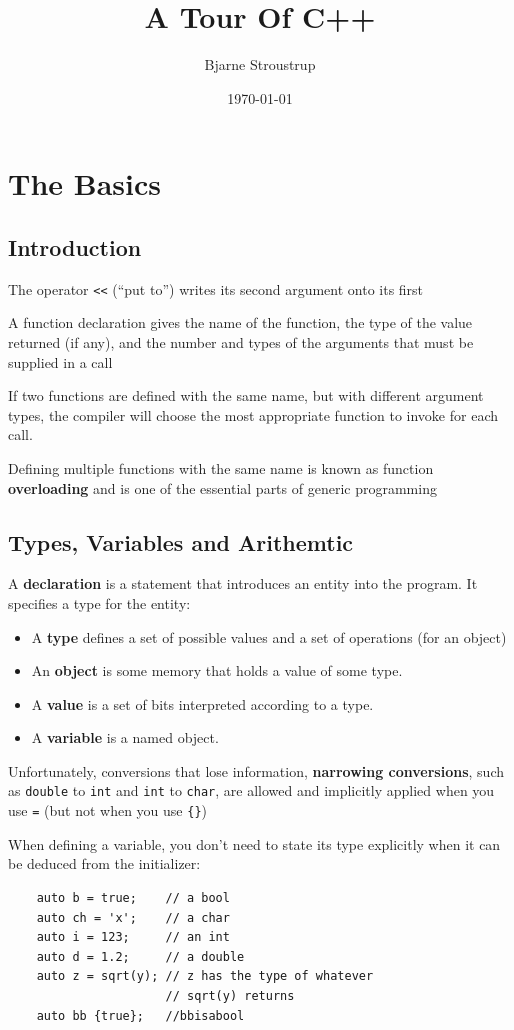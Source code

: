 \documentclass[11pt]{article}
\author{Bjarne Stroustrup}
\date{\today}
\title{A Tour Of C++}
\begin{document}
\maketitle
\tableofcontents

\section{The Basics}
\label{sec:org4c8b103}
\subsection{Introduction}
\label{sec:orgff95d27}
The operator \texttt{<<} (``put to'') writes its second argument onto its first

A function declaration gives the name of the function, the type of the value returned (if any),
and the number and types of the arguments that must be supplied in a call

If two functions are defined with the same name, but with different argument types, the compiler
will choose the most appropriate function to invoke for each call.

Defining multiple functions with the same name is known as function \textbf{overloading} and is one of the
essential parts of generic programming
\subsection{Types, Variables and Arithemtic}
\label{sec:orga438208}
A \textbf{declaration} is a statement that introduces an entity into the program. It specifies a type for
the entity:
\begin{itemize}
\item A \textbf{type} defines a set of possible values and a set of operations (for an object)
\item An \textbf{object} is some memory that holds a value of some type.
\item A \textbf{value} is a set of bits interpreted according to a type.
\item A \textbf{variable} is a named object.
\end{itemize}


Unfortunately, conversions that lose information, \textbf{narrowing conversions}, such as \texttt{double} to \texttt{int}
and \texttt{int} to \texttt{char}, are allowed and implicitly applied when you use \texttt{=} (but not when you use \texttt{\{\}})

When defining a variable, you don’t need to state its type explicitly when it can be deduced
from the initializer:
\begin{verbatim}
    auto b = true;    // a bool
    auto ch = 'x';    // a char
    auto i = 123;     // an int
    auto d = 1.2;     // a double
    auto z = sqrt(y); // z has the type of whatever
                      // sqrt(y) returns 
    auto bb {true};   //bbisabool
\end{verbatim}
\end{document}
